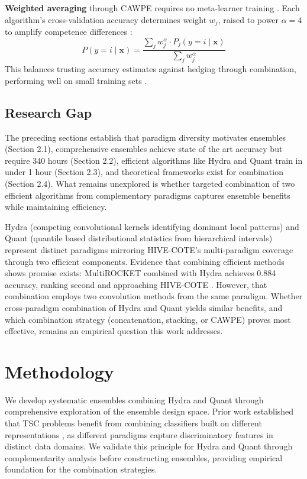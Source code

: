 \documentclass[pdflatex,sn-basic]{sn-jnl}           %
\theoremstyle{thmstyleone}%
\theoremstyle{thmstyletwo}%
\theoremstyle{thmstylethree}%
\begin{document}
\textbf{Weighted averaging} through CAWPE requires no meta-learner training \citep{cawpe}. Each algorithm's cross-validation accuracy determines weight $w_j$, raised to power $\alpha=4$ to amplify competence differences \citep[p.~1675]{cawpe}:
\begin{equation}
P(y=i \mid \mathbf{x}) = \frac{\sum_j w_j^\alpha \cdot P_j(y=i \mid \mathbf{x})}{\sum_j w_j^\alpha}
\end{equation}
This balances trusting accuracy estimates against hedging through combination, performing well on small training sets \citep[Table~3, p.~1693]{cawpe}.

\subsection{Research Gap}

The preceding sections establish that paradigm diversity motivates ensembles (Section 2.1), comprehensive ensembles achieve state of the art accuracy but require 340 hours (Section 2.2), efficient algorithms like Hydra and Quant train in under 1 hour (Section 2.3), and theoretical frameworks exist for combination (Section 2.4). What remains unexplored is whether targeted combination of two efficient algorithms from complementary paradigms captures ensemble benefits while maintaining efficiency.

Hydra (competing convolutional kernels identifying dominant local patterns) and Quant (quantile based distributional statistics from hierarchical intervals) represent distinct paradigms mirroring HIVE-COTE's multi-paradigm coverage through two efficient components. Evidence that combining efficient methods shows promise exists: MultiROCKET combined with Hydra achieves 0.884 accuracy, ranking second and approaching HIVE-COTE \citep[Table~14, p.~2008]{bakeoff-redux}. However, that combination employs two convolution methods from the same paradigm. Whether cross-paradigm combination of Hydra and Quant yields similar benefits, and which combination strategy (concatenation, stacking, or CAWPE) proves most effective, remains an empirical question this work addresses.

\clearpage

\section{Methodology}\label{sec3}

We develop systematic ensembles combining Hydra and Quant through comprehensive exploration of the ensemble design space. Prior work established that TSC problems benefit from combining classifiers built on different representations \citep[p.~3213]{hive-cote-2}, as different paradigms capture discriminatory features in distinct data domains. We validate this principle for Hydra and Quant through complementarity analysis before constructing ensembles, providing empirical foundation for the combination strategies.
\end{document}
